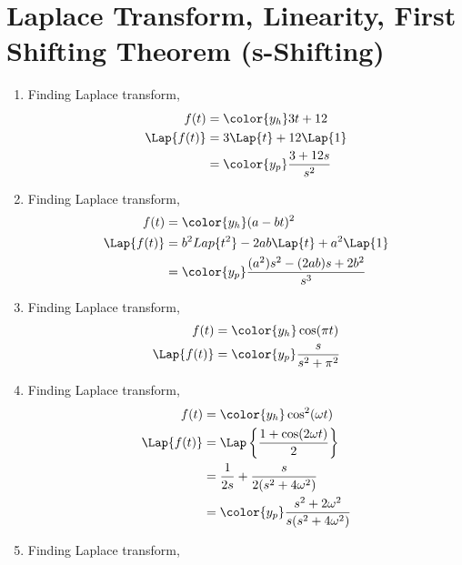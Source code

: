 \section{Laplace Transform, Linearity, First Shifting Theorem (s-Shifting)}

\begin{enumerate}
      \item Finding Laplace transform,
            \begin{align}
                  f(t)         & = \color{y_h} 3t + 12             \\
                  \Lap\{f(t)\} & = 3 \Lap \{t\} + 12 \Lap \{1\}    \\
                               & = \color{y_p} \frac{3 + 12s}{s^2}
            \end{align}
      \item Finding Laplace transform,
            \begin{align}
                  f(t)         & = \color{y_h} (a-bt)^2                             \\
                  \Lap\{f(t)\} & = b^2 Lap\{t^2\} - 2ab \Lap \{t\} + a^2 \Lap \{1\} \\
                               & = \color{y_p} \frac{(a^2)s^2 - (2ab)s + 2b^2}{s^3}
            \end{align}
      \item Finding Laplace transform,
            \begin{align}
                  f(t)         & = \color{y_h} \cos(\pi t)           \\
                  \Lap\{f(t)\} & = \color{y_p} \frac{s}{s^2 + \pi^2}
            \end{align}
      \item Finding Laplace transform,
            \begin{align}
                  f(t)         & = \color{y_h} \cos^2(\omega t)                            \\
                  \Lap\{f(t)\} & = \Lap\left\{ \frac{1 + \cos(2\omega t)}{2} \right\}      \\
                               & = \frac{1}{2s} + \frac{s}{2(s^2 + 4\omega^2)}             \\
                               & = \color{y_p}  \frac{s^2 + 2\omega^2}{s(s^2 + 4\omega^2)}
            \end{align}
      \item Finding Laplace transform,
            \begin{align}

\end{align}
\end{enumerate}
